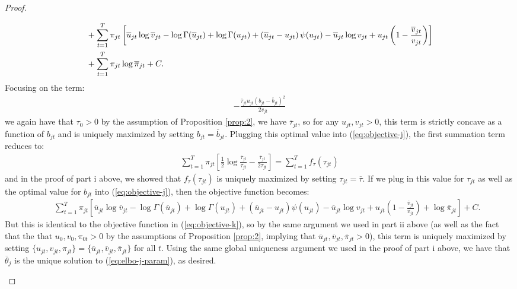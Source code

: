 \begin{proof}
\begin{enumerate}[label=\roman*.]
\begin{align}
    &+ \sum_{t=1}^T \pi_{jt}\left[\overline{u}_{jt} \log \overline{v}_{jt} -  \log\Gamma(\overline{u}_{jt}) + \log\Gamma(u_{jt}) + \left(\overline{u}_{jt} -u_{jt}\right)\psi(u_{jt}) - \overline{u}_{jt}\log v_{jt} + u_{jt}\left(1- \frac{\overline{v}_{jt} }{v_{jt}}\right)\right] \notag \\ \label{eq:objective-j}
    &+ \sum_{t=1}^T \pi_{jt} \log \overline{\pi}_{jt}+ C. 
\end{align}
\normalsize
Focusing on the term:
\begin{align*}
    - \frac{\overline{\tau}_{j t}u_{jt}(b_{j t}  - \overline{b}_{j t})^2}{2v_{jt}}
\end{align*}
we again have that $\tau_0 > 0$ by the assumption of Proposition \ref{prop:2}, we have $\overline{\tau}_{j t}$, so for any $u_{jt}, v_{jt} > 0$, this term is strictly concave as a function of $b_{j t}$ and is uniquely maximized by setting $b_{j t} = \overline{b}_{j t}$. Plugging this optimal value into (\ref{eq:objective-j}), the first summation term reduces to:
\begin{align*}
    \sum_{t=1}^T \pi_{jt}\left[\frac{1}{2}\log \frac{\overline{\tau}_{j t}}{\tau_{jt}}  - \frac{\overline{\tau}_{j t}}{2\tau_{j t}}\right] = \sum_{t=1}^T f_{\tau}(\tau_{jt})
\end{align*}
and in the proof of part i above, we showed that $f_{\tau}(\tau_{jt})$ is uniquely maximized by setting $\tau_{jt} = \overline{\tau}$. If we plug in this value for $\tau_{jt}$ as well as the optimal value for $b_{jt}$ into (\ref{eq:objective-j}), then the objective function becomes:
\small
\begin{align*}
    &\quad\sum_{t=1}^T \pi_{jt}\left[\overline{u}_{jt} \log \overline{v}_{jt} -  \log\Gamma(\overline{u}_{jt}) + \log\Gamma(u_{jt}) + \left(\overline{u}_{jt} -u_{jt}\right)\psi(u_{jt}) - \overline{u}_{jt}\log v_{jt} + u_{jt}\left(1- \frac{\overline{v}_{jt} }{v_{jt}}\right) + \log \overline{\pi}_{jt}\right] + C.
\end{align*}
\normalsize
But this is identical to the objective function in (\ref{eq:objective-k}), so by the same argument we used in part ii above (as well as the fact that the that $u_0,v_0,\pi_{0t} >0$ by the assumptions of Proposition \ref{prop:2}, implying that $\overline{u}_{jt}, \overline{v}_{jt}, \overline{\pi}_{jt} > 0$), this term is uniquely maximized by setting $\{u_{jt}, v_{jt}, \pi_{jt}\} = \{\overline{u}_{jt}, \overline{v}_{jt}, \overline{\pi}_{jt}\}$ for all $t$. Using the same global uniqueness argument we used in the proof of part i above, we have that $\overline{\theta}_j$ is the unique solution to (\ref{eq:elbo-j-param}), as desired.

\end{enumerate}
\end{proof}